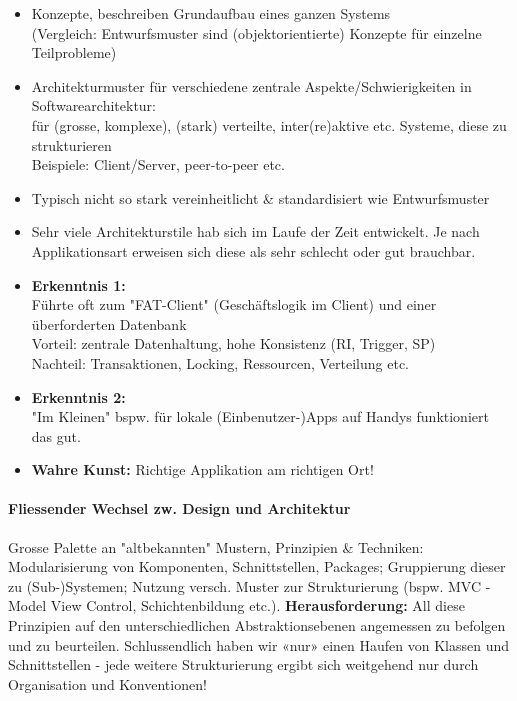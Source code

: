 \documentclass[a4paper]{article}
\begin{document}
			\begin{itemize}
				\item Konzepte, beschreiben Grundaufbau eines ganzen Systems\\
				(Vergleich: Entwurfsmuster sind (objektorientierte) Konzepte für einzelne Teilprobleme)
				
				\item Architekturmuster für verschiedene zentrale Aspekte/Schwierigkeiten in Softwarearchitektur:\\
				für (grosse, komplexe), (stark) verteilte, inter(re)aktive etc. Systeme, diese zu strukturieren\\
				Beispiele: Client/Server, peer-to-peer etc.
				
				\item Typisch nicht so stark vereinheitlicht \& standardisiert wie Entwurfsmuster
				
				\item Sehr viele Architekturstile hab sich im Laufe der Zeit entwickelt.
				Je nach Applikationsart erweisen sich diese als sehr schlecht oder gut brauchbar.
				
				\item \textbf{Erkenntnis 1:}\\
				Führte oft zum "FAT-Client" (Geschäftslogik im Client) und einer überforderten Datenbank\\
				Vorteil: zentrale Datenhaltung, hohe Konsistenz (RI, Trigger, SP)\\
				Nachteil: Transaktionen, Locking, Ressourcen, Verteilung etc.
				
				\item \textbf{Erkenntnis 2:}\\
				"Im Kleinen" bspw. für lokale (Einbenutzer-)Apps auf Handys funktioniert das gut.
				
				\item \textbf{Wahre Kunst:} Richtige Applikation am richtigen Ort!
			\end{itemize}
		
				\paragraph{Fliessender Wechsel zw. Design und Architektur}
				
				Grosse Palette an "altbekannten" Mustern, Prinzipien \& Techniken:
				Modularisierung von Komponenten, Schnittstellen, Packages;
				Gruppierung dieser zu (Sub-)Systemen;
				Nutzung versch. Muster zur Strukturierung (bspw. MVC - Model View Control, Schichtenbildung etc.).
				\textbf{Herausforderung:} All diese Prinzipien auf den unterschiedlichen Abstraktionsebenen angemessen zu befolgen und zu beurteilen.
				Schlussendlich haben wir «nur» einen Haufen von Klassen und Schnittstellen - jede weitere Strukturierung ergibt sich weitgehend nur durch Organisation und Konventionen!
				
\end{document}
